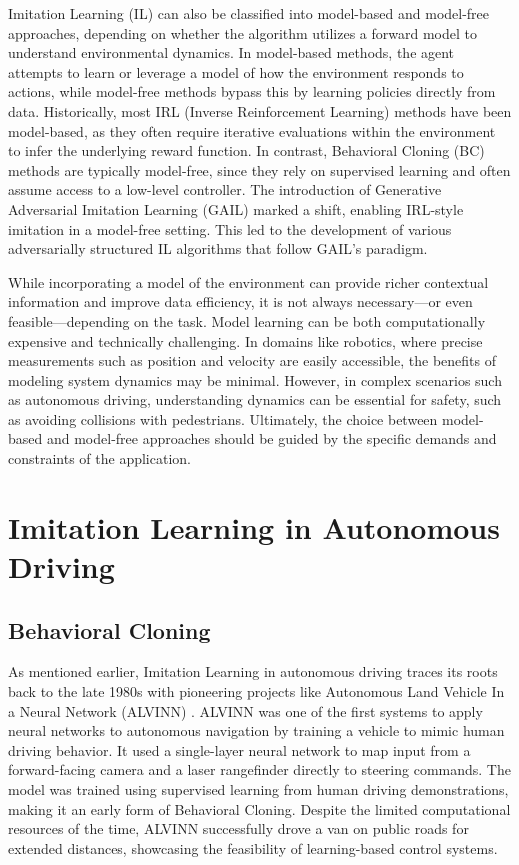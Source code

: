 Imitation Learning (IL) can also be classified into model-based and model-free approaches, depending on whether the algorithm utilizes a forward model to understand environmental dynamics. In model-based methods, the agent attempts to learn or leverage a model of how the environment responds to actions, while model-free methods bypass this by learning policies directly from data. Historically, most IRL (Inverse Reinforcement Learning) methods have been model-based, as they often require iterative evaluations within the environment to infer the underlying reward function. In contrast, Behavioral Cloning (BC) methods are typically model-free, since they rely on supervised learning and often assume access to a low-level controller. The introduction of Generative Adversarial Imitation Learning (GAIL) \autocite{ho2016generative} marked a shift, enabling IRL-style imitation in a model-free setting. This led to the development of various adversarially structured IL algorithms that follow GAIL’s paradigm.

While incorporating a model of the environment can provide richer contextual information and improve data efficiency, it is not always necessary—or even feasible—depending on the task. Model learning can be both computationally expensive and technically challenging. In domains like robotics, where precise measurements such as position and velocity are easily accessible, the benefits of modeling system dynamics may be minimal. However, in complex scenarios such as autonomous driving, understanding dynamics can be essential for safety, such as avoiding collisions with pedestrians. Ultimately, the choice between model-based and model-free approaches should be guided by the specific demands and constraints of the application. \autocite{zheng2022imitationlearningprogresstaxonomies}

\section{Imitation Learning in Autonomous Driving}

\subsection{Behavioral Cloning}

As mentioned earlier, Imitation Learning in autonomous driving traces its roots back to the late 1980s with pioneering projects like Autonomous Land Vehicle In a Neural Network (ALVINN) \autocite{NIPS1988_812b4ba2}. ALVINN was one of the first systems to apply neural networks to autonomous navigation by training a vehicle to mimic human driving behavior. It used a single-layer neural network to map input from a forward-facing camera and a laser rangefinder directly to steering commands. The model was trained using supervised learning from human driving demonstrations, making it an early form of Behavioral Cloning. Despite the limited computational resources of the time, ALVINN successfully drove a van on public roads for extended distances, showcasing the feasibility of learning-based control systems.


